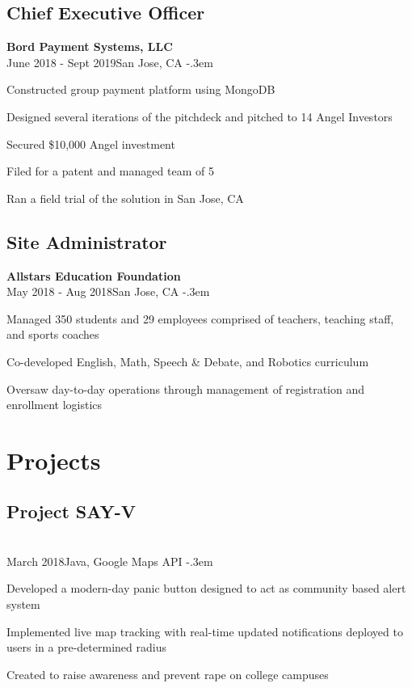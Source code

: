 \documentclass{article}
\let\olditemize=\itemize \let\endolditemize=\enditemize
\renewenvironment{itemize}{\olditemize[topsep=0em] \itemsep-.3em}{\endolditemize}
\newcommand{\entry}[3]{\quad\textbf{#1}\\#2\qquad#3}
\begin{document}
\subsection{Chief Executive Officer}
\entry{Bord Payment Systems, LLC}{June 2018 - Sept 2019}{San Jose, CA}
	\begin{itemize}
		\item Constructed group payment platform using MongoDB
		\item Designed several iterations of the pitchdeck and pitched to 14 Angel Investors
		\item Secured \$10,000 Angel investment
		\item Filed for a patent and managed team of 5
		\item Ran a field trial of the solution in San Jose, CA
	\end{itemize}
\subsection{Site Administrator}
\entry{Allstars Education Foundation}{May 2018 - Aug 2018}{San Jose, CA}
\begin{itemize}
	\item Managed 350 students and 29 employees comprised of teachers, teaching staff, and sports coaches
	\item Co-developed English, Math, Speech \& Debate, and Robotics curriculum
	\item Oversaw day-to-day operations through management of registration and enrollment logistics
\end{itemize}

\section{Projects}
\subsection{Project SAY-V}
\entry{}{March 2018}{Java, Google Maps API}
\begin{itemize}
  \item Developed a modern-day panic button designed to act as community based alert system
  \item Implemented live map tracking with real-time updated notifications deployed to users in a pre-determined radius
  \item Created to raise awareness and prevent rape on college campuses
\end{itemize}
\end{document}
